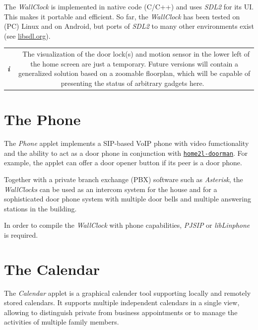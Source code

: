 \documentclass[12pt,english,parskip=half]{scrreprt}
\newcommand{\infobox}[1]{
  \hfill
  \setlength\arrayrulewidth{1pt}
  \begin{tabular}[t]{c|c|}
    \parbox{1.8em}{\hfill\textit{\Huge\textbf{i}\,}}
    &
    \,\parbox{0.89\linewidth}{\setlength{\parskip}{0.5em}#1}\,
  \end{tabular}
  \par
}
\newcommand{\idx}[1]{#1\index{#1}}
\newcommand{\toolref}[1]{\hyperref[tool:#1]{\texttt{\idx{#1}}}}
\begin{document}
The \emph{WallClock} is implemented in native code (C/C++) and uses \emph{SDL2} for its UI.
This makes it portable and efficient. So far, the \emph{WallClock} has been tested on
(PC) Linux and on Android, but ports of \emph{SDL2} to many other environments exist
(see \url{libsdl.org}).

\infobox{
  The visualization of the door lock(s) and motion sensor in the lower
  left of the home screen are just a temporary. Future versions will
  contain a generalized solution based on a zoomable floorplan,
  which will be capable of presenting the status of arbitrary gadgets here.
}





\section{The Phone}
\label{sec:wallclock-phone}


The \emph{Phone} applet implements a SIP-based VoIP phone with video
fumctionality and the ability to act as a door phone in conjunction
with \toolref{home2l-doorman}. For example, the applet can offer a door
opener button if its peer is a door phone.

Together with a private branch exchange (PBX) software such as
\emph{Asterisk}, the \emph{WallClocks} can be used as an intercom
system for the house and for a sophisticated door phone system with
multiple door bells and multiple answering stations in the building.

In order to compile the \emph{WallClock} with phone capabilities,
\emph{PJSIP} or \emph{libLinphone} is required.





\section{The Calendar}
\label{sec:wallclock-calendar}


The \emph{Calendar} applet is a graphical calender tool supporting
locally and remotely stored calendars. It supports multiple independent
calendars in a single view, allowing to distinguish private from
business appointments or to manage the activities of multiple family
members.
\end{document}
